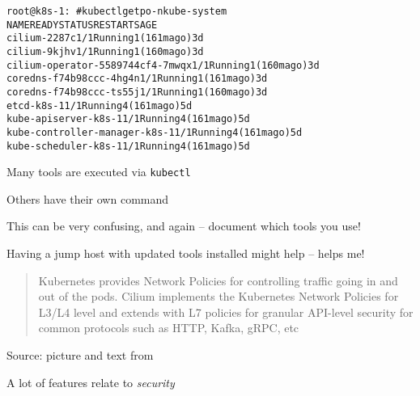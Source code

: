 \documentclass[Screen16to9,17pt]{foils}
\begin{document}
\begin{alltt}\footnotesize
root@k8s-1:~# kubectl get po -n kube-system
NAME                               READY   STATUS    RESTARTS       AGE
cilium-2287c                       1/1     Running   1 (161m ago)   3d
cilium-9kjhv                       1/1     Running   1 (160m ago)   3d
cilium-operator-5589744cf4-7mwqx   1/1     Running   1 (160m ago)   3d
coredns-f74b98ccc-4hg4n            1/1     Running   1 (161m ago)   3d
coredns-f74b98ccc-ts55j            1/1     Running   1 (160m ago)   3d
etcd-k8s-1                         1/1     Running   4 (161m ago)   5d
kube-apiserver-k8s-1               1/1     Running   4 (161m ago)   5d
kube-controller-manager-k8s-1      1/1     Running   4 (161m ago)   5d
kube-scheduler-k8s-1               1/1     Running   4 (161m ago)   5d
\end{alltt}




\begin{list2}
\item Many tools are executed via \verb+kubectl+
\item Others have their own command
\item This can be very confusing, and again -- document which tools you use!
\item Having a jump host with updated tools installed might help -- helps me!
\end{list2}



\begin{quote}
Kubernetes provides Network Policies for controlling traffic going in and out of the pods. Cilium implements the Kubernetes Network Policies for L3/L4 level and extends with L7 policies for granular API-level security for common protocols such as HTTP, Kafka, gRPC, etc
\end{quote}
Source: picture and text from 




\begin{list2}
\item A lot of features relate to \emph{security}
\end{list2}
\end{document}
